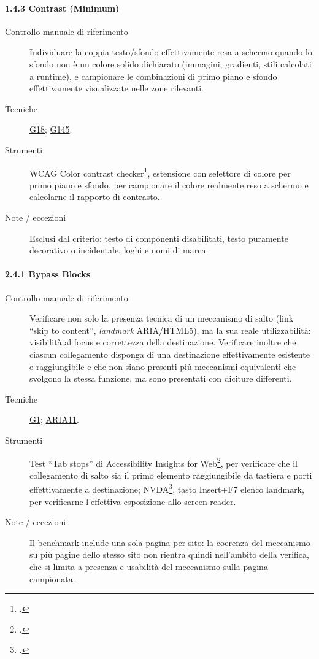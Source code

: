 \paragraph*{1.4.3 Contrast (Minimum)}
\begin{description}
\item[Controllo manuale di riferimento] Individuare la coppia testo/sfondo effettivamente resa a schermo quando lo sfondo non è un colore solido dichiarato (immagini, gradienti, stili calcolati a runtime), e campionare le combinazioni di primo piano e sfondo effettivamente visualizzate nelle zone rilevanti.
\item[Tecniche] \href{https://www.w3.org/WAI/WCAG21/Techniques/general/G18.html}{G18}; \href{https://www.w3.org/WAI/WCAG21/Techniques/general/G145.html}{G145}.
\item[Strumenti] WCAG Color contrast checker\footcite{wcag:colorcontrastchecker}, estensione con selettore di colore per primo piano e sfondo, per campionare il colore realmente reso a schermo e calcolarne il rapporto di contrasto.
\item[Note / eccezioni] Esclusi dal criterio: testo di componenti disabilitati, testo puramente decorativo o incidentale, loghi e nomi di marca.
\end{description}

\paragraph*{2.4.1 Bypass Blocks}
\begin{description}
\item[Controllo manuale di riferimento] Verificare non solo la presenza tecnica di un meccanismo di salto (link \enquote{skip to content}, \emph{landmark} ARIA/HTML5), ma la sua reale utilizzabilità: visibilità al focus e correttezza della destinazione. Verificare inoltre che ciascun collegamento disponga di una destinazione effettivamente esistente e raggiungibile e che non siano presenti più meccanismi equivalenti che svolgono la stessa funzione, ma sono presentati con diciture differenti.
\item[Tecniche] \href{https://www.w3.org/WAI/WCAG21/Techniques/general/G1.html}{G1}; \href{https://www.w3.org/WAI/WCAG21/Techniques/aria/ARIA11.html}{ARIA11}.
\item[Strumenti] Test \enquote{Tab stops} di Accessibility Insights for Web\footcite{accessibilityinsights:tabstops}, per verificare che il collegamento di salto sia il primo elemento raggiungibile da tastiera e porti effettivamente a destinazione; NVDA\footcite{nvda:screenreader}, tasto Insert+F7 \textrightarrow{} elenco landmark, per verificarne l'effettiva esposizione allo screen reader.
\item[Note / eccezioni] Il benchmark include una sola pagina per sito: la coerenza del meccanismo su più pagine dello stesso sito non rientra quindi nell'ambito della verifica, che si limita a presenza e usabilità del meccanismo sulla pagina campionata.
\end{description}

